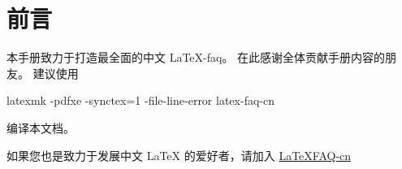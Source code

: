 \section*{前言}
本手册致力于打造最全面的中文 \LaTeX{}-faq。
在此感谢全体贡献手册内容的朋友。
建议使用
\begin{shcode}
  latexmk -pdfxe -synctex=1 -file-line-error latex-faq-cn
\end{shcode}
编译本文档。

如果您也是致力于发展中文 \LaTeX{} 的爱好者，请加入 \href{https://github.com/latexstudio/LaTeXFAQ-cn}{LaTeXFAQ-cn}
\clearpage